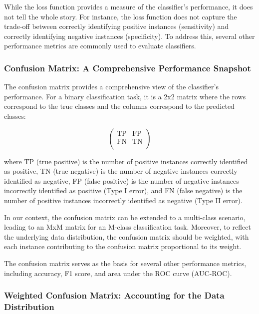 While the loss function provides a measure of the classifier's performance, it does not tell the whole story. For
instance, the loss function does not capture the trade-off between correctly identifying positive instances
(sensitivity) and correctly identifying negative instances (specificity). To address this, several other performance
metrics are commonly used to evaluate classifiers.

\subsubsection{Confusion Matrix: A Comprehensive Performance Snapshot}

The confusion matrix provides a comprehensive view of the classifier's performance. For a binary classification task, it
is a 2x2 matrix where the rows correspond to the true classes and the columns correspond to the predicted classes:

\begin{equation}
    \begin{pmatrix}
        \text{TP} & \text{FP} \\
        \text{FN} & \text{TN} \\
    \end{pmatrix}
\end{equation}

where TP (true positive) is the number of positive instances correctly identified as positive, TN (true negative) is the
number of negative instances correctly identified as negative, FP (false positive) is the number of negative instances
incorrectly identified as positive (Type I error), and FN (false negative) is the number of positive instances
incorrectly identified as negative (Type II error).

In our context, the confusion matrix can be extended to a multi-class scenario, leading to an MxM matrix for an M-class
classification task. Moreover, to reflect the underlying data distribution, the confusion matrix should be weighted,
with each instance contributing to the confusion matrix proportional to its weight.

The confusion matrix serves as the basis for several other performance metrics, including accuracy, F1 score, and area
under the ROC curve (AUC-ROC).

\subsubsection{Weighted Confusion Matrix: Accounting for the Data Distribution}

